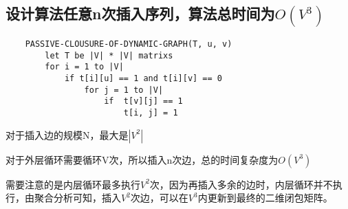 \documentclass[UTF8]{ctexart}
\begin{document}
 \subsection{设计算法任意n次插入序列，算法总时间为$O(V^3)$}

 \begin{lstlisting}
    PASSIVE-CLOUSURE-OF-DYNAMIC-GRAPH(T, u, v)
        let T be |V| * |V| matrixs
        for i = 1 to |V|
            if t[i][u] == 1 and t[i][v] == 0
                for j = 1 to |V|
                    if  t[v][j] == 1 
                        t[i, j] = 1
 \end{lstlisting}

 对于插入边的规模N，最大是$|V^2|$

 对于外层循环需要循环V次，所以插入n次边，总的时间复杂度为$O(V^3)$

 需要注意的是内层循环最多执行$V^2$次，因为再插入多余的边时，内层循环并不执行，由聚合分析可知，插入$V^2$次边，可以在$V^3$内更新到最终的二维闭包矩阵。
\end{document}
